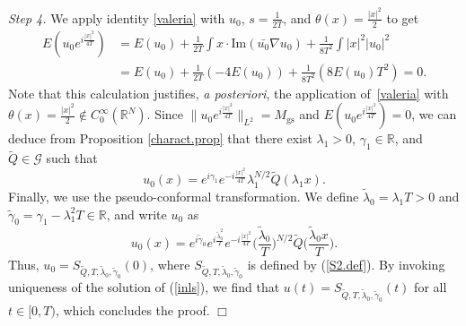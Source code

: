 \documentclass[reqno]{amsart}
\newcommand{\real}{\mathbb{R}}
\newcommand{\rn}{\real^N}
\newcommand{\wt}{\widetilde}
\theoremstyle{plain}
\theoremstyle{definition}
\numberwithin{equation}{section}
\newenvironment{proofof}
{\medskip\noindent{\it Proof of}}{\nolinebreak\hfill$\Box$\medskip}
\begin{document}
\begin{proofof}
\medskip
\noindent
{\em Step 4.} 
We apply identity \eqref{valeria} with $u_0$, $s=\frac{1}{2T}$, and $\theta(x)=\frac{|x|^2}{2}$ to get 
\[
\begin{split}
E(u_0e^{i\frac{|x|^2}{4T}})&=E(u_0)+\frac{1}{2T}\int x\cdot\text{Im}(\bar{u_0}\nabla u_0)
+\frac{1}{8T^2}\int|x|^2|u_0|^2\\
&=E(u_0)+\frac{1}{2T}(-4E(u_0))+\frac{1}{8T^2}(8E(u_0)T^2)=0.
\end{split}
\]
Note that this calculation justifies, {\em a posteriori}, the application of~\eqref{valeria}
with $\theta(x)=\frac{|x|^2}{2}\not\in C_0^{\infty}(\rn)$.
Since $\|u_0e^{i\frac{|x|^2}{4T}}\|_{L^2}=M_\mathrm{gs}$ and $E(u_0e^{i\frac{|x|^2}{4T}})=0$, 
we can deduce from Proposition \ref{charact.prop} that there exist $\lambda_1>0$, 
$\gamma_1\in\real$, and $\wt{Q}\in\mathcal{G}$ such that
\[
u_0(x)=e^{i\gamma_1}e^{-i\frac{|x|^2}{4T}}\lambda_1^{N/2}\wt{Q}(\lambda_1x).
\]
Finally, we use the pseudo-conformal transformation. We define $\tilde\lambda_0=\lambda_1T>0$ and 
$\tilde\gamma_0=\gamma_1-\lambda_1^2T\in\real$, and write $u_0$ as
\[
u_0(x)=e^{i\tilde\gamma_0}e^{i\frac{\tilde\lambda^2_0}{T}}
e^{-i\frac{|x|^2}{4T}}\Big(\frac{\tilde\lambda_0}{T}\Big)^{N/2}\wt{Q}\Big(\frac{\tilde\lambda_0x}{T}\Big).
\]
Thus, $u_0=S_{\wt{Q},T,\tilde\lambda_0,\tilde\gamma_0}(0)$, where 
$S_{\wt{Q},T,\tilde\lambda_0,\tilde\gamma_0}$ 
is defined by (\ref{S2.def}). By invoking uniqueness of the solution of (\ref{inls}), 
we find that $u(t)=S_{\wt{Q},T,\tilde\lambda_0,\tilde\gamma_0}(t)$ for all $t\in[0,T)$, 
which concludes the proof.  
\end{proofof}

\end{document}
